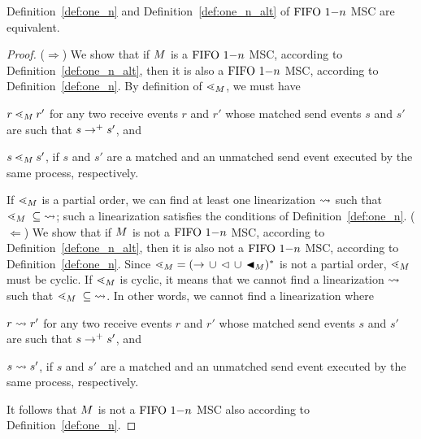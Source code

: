 \begin{proposition}
    Definition~\ref{def:one_n} and Definition~\ref{def:one_n_alt} of $\text{FIFO } 1\mathsf{-}n$ MSC are equivalent.
\end{proposition}
\begin{proof}
    ($\Rightarrow$)  We show that if $M$ is a $\text{FIFO } 1\mathsf{-}n$ MSC, according to Definition~\ref{def:one_n_alt}, then it is also a $\text{FIFO } 1\mathsf{-}n$ MSC, according to Definition~\ref{def:one_n}. By definition of $\lessdot_M$, we must have 
    \begin{enumerate*}[label={(\roman*)}]
        \item $r \lessdot_M r'$ for any two receive events $r$ and $r'$ whose matched send events $s$ and $s'$ are such that $s \to^+ s'$, and
        \item $s \lessdot_M s'$, if $s$ and $s'$ are a matched and an unmatched send event executed by the same process, respectively.
    \end{enumerate*} 
    If $\lessdot_M$ is a partial order, we can find at least one linearization $\rightsquigarrow$ such that $\lessdot_M \;\subseteq\; \rightsquigarrow$; such a linearization satisfies the conditions of Definition~\ref{def:one_n}.\newline
    ($\Leftarrow$) We show that if $M$ is not a $\text{FIFO } 1\mathsf{-}n$ MSC, according to Definition~\ref{def:one_n_alt}, then it is also not a $\text{FIFO } 1\mathsf{-}n$ MSC, according to Definition~\ref{def:one_n}. Since ${\lessdot_M} = ({\to} \,\cup\, {\lhd} \,\cup\, {\blacktriangleleft_M})^\ast$ is not a partial order, $\lessdot_M$ must be cyclic. If $\lessdot_M$ is cyclic, it means that we cannot find a linearization $\rightsquigarrow$ such that $\lessdot_M \;\subseteq\; \rightsquigarrow$. In other words, we cannot find a linearization where      
    \begin{enumerate*}[label={(\roman*)}]
        \item $r \rightsquigarrow r'$ for any two receive events $r$ and $r'$ whose matched send events $s$ and $s'$ are such that $s \to^+ s'$, and
        \item $s \rightsquigarrow s'$, if $s$ and $s'$ are a matched and an unmatched send event executed by the same process, respectively.
    \end{enumerate*} 
    It follows that $M$ is not a $\text{FIFO } 1\mathsf{-}n$ MSC also according to Definition~\ref{def:one_n}.
\end{proof}